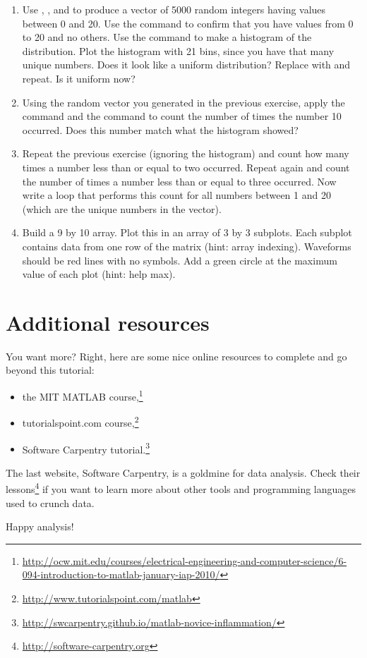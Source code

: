 \documentclass{article}
\begin{document}
\begin{enumerate}

\item Use , , and \mcode{*} to produce a vector of 5000 random integers having values between 0 and 20.
Use the  command to confirm that you have values from 0 to 20 and no others.
Use the  command to make a histogram of the distribution.
Plot the histogram with 21 bins, since you have that many unique numbers.
Does it look like a uniform distribution? Replace  with  and repeat.
Is it uniform now?

\item Using the random vector you generated in the previous exercise, apply the  command and the  command to count the number of times the number 10 occurred.
  Does this number match what the histogram showed?

\item Repeat the previous exercise (ignoring the histogram) and count how many times a number less than or equal to two occurred.
  Repeat again and count the number of times a number less than or equal to three occurred.
  Now write a  loop that performs this count for all numbers between 1 and 20 (which are the unique numbers in the vector).

\item Build a 9 by 10 array. Plot this in an array of 3 by 3 subplots.
  Each subplot contains data from one row of the matrix (hint: array indexing).
  Waveforms should be red lines with no symbols.
  Add a green circle at the maximum value of each plot (hint: help max).

\end{enumerate}

\section{Additional resources}

You want more?
Right, here are some nice online resources to complete and go beyond this tutorial:
\begin{itemize}
  \item the MIT MATLAB course,\footnote{%
    \url{http://ocw.mit.edu/courses/electrical-engineering-and-computer-science/6-094-introduction-to-matlab-january-iap-2010/}
  }
  \item tutorialspoint.com course,\footnote{%
    \url{http://www.tutorialspoint.com/matlab}
  }
  \item Software Carpentry tutorial.\footnote{%
    \url{http://swcarpentry.github.io/matlab-novice-inflammation/}
  }
\end{itemize}

The last website, Software Carpentry, is a goldmine for data analysis.
Check their lessons\footnote{\url{http://software-carpentry.org}} if you want to learn more about other tools and programming languages used to crunch data.

Happy analysis!
\end{document}
